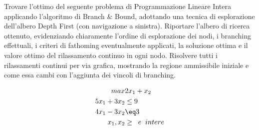 \documentclass[a4paper,12pt,oneside]{article}
\begin{document}
    Trovare l’ottimo del seguente problema di Programmazione Lineare Intera applicando l’algoritmo di Branch & Bound, adottando una tecnica di esplorazione dell’albero Depth First (con navigazione a sinistra). Riportare l’albero di ricerca ottenuto, evidenziando chiaramente l’ordine di esplorazione dei nodi, i branching effettuali, i criteri di fathoming eventualmente applicati, la soluzione ottima e il valore ottimo del rilassamento continuo in ogni nodo. Risolvere tutti i rilassamenti continui per via grafica, mostrando la regione ammissibile iniziale e come essa cambi con l’aggiunta dei vincoli di branching.

    \begin{align*}
        max & 2 x_1 + x_2 \\
        5 x_1 + 3 x_2 &\leq 9 \\
        4 x_1  - 3 x_2 &\eq 3 \\
        x_1,x_2 &\geq \;\; e \;\; intere
    \end{align*}
\end{document}
